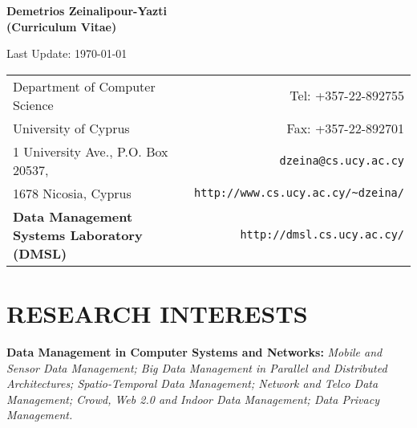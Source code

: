 \documentclass[10pt]{article}
\begin{document}
\linespread{1.0}


\renewcommand{\thesection}{\Roman{section}.}


\begin{samepage}


{\center
{\Large\bf Demetrios Zeinalipour-Yazti \\ (Curriculum Vitae) \\  \centerline{\small Last Update: \today}} \vspace{0.1in} }

\begin{center} 
\begin{tabular*}{1.0\textwidth}%
   {@{\extracolsep{\fill}}lr}
	Department of Computer Science 		& 	Tel:   +357-22-892755 \\
	University of Cyprus                & 	Fax:   +357-22-892701  \\
	1 University Ave., P.O. Box 20537, 	&	{\tt dzeina@cs.ucy.ac.cy}	\\
	1678 Nicosia, Cyprus                & 	{\tt http://www.cs.ucy.ac.cy/\~{}dzeina/}	\\
    {\bf Data Management Systems Laboratory (DMSL)}  &  	{\tt http://dmsl.cs.ucy.ac.cy/}	\\
\end{tabular*}
\end{center}


\addtolength{\itemsep}{-1ex} \addtolength{\topsep}{-1.5ex}


\section{\bf RESEARCH INTERESTS}
{\bf Data Management in Computer Systems and Networks:}
{\em Mobile and Sensor Data Management; Big Data Management in Parallel and Distributed Architectures; Spatio-Temporal Data Management; Network and Telco Data Management; Crowd, Web 2.0 and Indoor Data Management; Data Privacy Management.}



\end{samepage}
\end{document}

